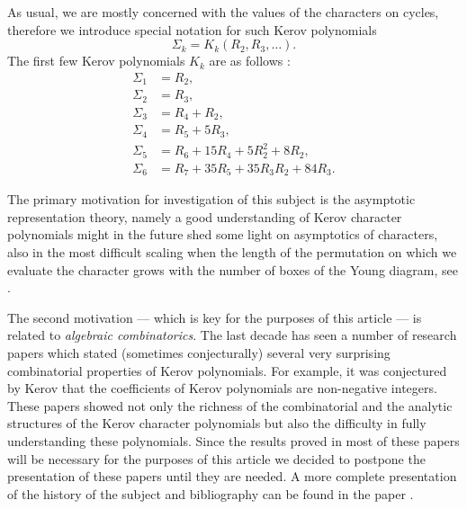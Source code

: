 \documentclass[12pt]{amsart}
\theoremstyle{plain}
\theoremstyle{remark}
\begin{document}
As usual, we are mostly concerned with the values of the characters on cycles,
therefore we introduce special notation for such Kerov polynomials
$$ \Sigma_k = K_{k}(R_2,R_3,\dots).$$
The first few Kerov polynomials $K_k$ are as follows \cite{Biane2001}:
\begin{align*}
\Sigma_1 &= R_2, \\
\Sigma_2 &= R_3, \\
\Sigma_3 &= R_4 + R_2,   \\
\Sigma_4 &= R_5 + 5R_3,    \\
\Sigma_5 &= R_6 + 15R_4 + 5R_2^2 + 8R_2, \\
\Sigma_6 &= R_7 + 35R_5 + 35R_3 R_2 + 84R_3.
\end{align*}

The primary motivation for investigation of this subject is the asymptotic
representation theory, namely a good understanding of Kerov character
polynomials might in the future shed some light on asymptotics of characters,
also in the most difficult scaling when the length of the permutation on which
we evaluate the character grows with the number of boxes of the Young diagram,
see \cite{F'eray'Sniady2011}. 

The second motivation --- which is key for the purposes of this article --- is
related to \emph{algebraic combinatorics}. The last decade has seen a number of
research papers which stated (sometimes conjecturally) several very surprising
combinatorial properties of Kerov polynomials. For example, it was conjectured
by Kerov \cite{Kerov2000talk} that the coefficients of Kerov polynomials are
non-negative integers. These papers showed not only the richness of the
combinatorial and the analytic structures of the Kerov character polynomials
but also the difficulty in fully understanding these polynomials. Since the
results proved in most of these papers will be necessary for the purposes of
this article we decided to postpone the presentation of these papers until they
are needed. A more complete presentation of the history of the subject and
bibliography can be found in the paper \cite{DolegaF'eray'Sniady2008}.
\end{document}
